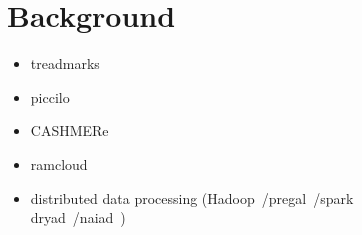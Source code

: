 \section{Background}
\label{sec:background}

\begin{itemize}
    \item treadmarks~\cite{Keleher1994}  \\
    \item piccilo~\cite{piccolo}   \\
    \item CASHMERe ~\cite{cashmere}   \\
    \item ramcloud~\cite{Ousterhout:2015:RSS:2818727.2806887}  \\
    \item distributed data processing (Hadoop~\cite{Dean2004}/pregal~\cite{Malewicz:2010:PSL:1807167.1807184}/spark~\cite{180560} \\ dryad~\cite{Isard:2007:DDD:1272996.1273005}/naiad~\cite{Murray:2013:NTD:2517349.2522738})  \\
\end{itemize}
